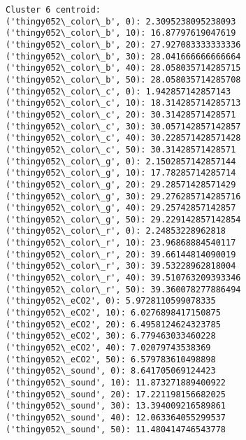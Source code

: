 \documentclass[11pt]{article}
\begin{document}
\begin{Verbatim}[commandchars=\\\{\}]
Cluster 6 centroid:
('thingy052\_color\_b', 0): 2.3095238095238093
('thingy052\_color\_b', 10): 16.87797619047619
('thingy052\_color\_b', 20): 27.927083333333336
('thingy052\_color\_b', 30): 28.041666666666664
('thingy052\_color\_b', 40): 28.058035714285715
('thingy052\_color\_b', 50): 28.058035714285708
('thingy052\_color\_c', 0): 1.942857142857143
('thingy052\_color\_c', 10): 18.314285714285713
('thingy052\_color\_c', 20): 30.31428571428571
('thingy052\_color\_c', 30): 30.057142857142857
('thingy052\_color\_c', 40): 30.228571428571428
('thingy052\_color\_c', 50): 30.31428571428571
('thingy052\_color\_g', 0): 2.1502857142857144
('thingy052\_color\_g', 10): 17.78285714285714
('thingy052\_color\_g', 20): 29.28571428571429
('thingy052\_color\_g', 30): 29.276285714285716
('thingy052\_color\_g', 40): 29.25742857142857
('thingy052\_color\_g', 50): 29.229142857142854
('thingy052\_color\_r', 0): 2.24853228962818
('thingy052\_color\_r', 10): 23.96868884540117
('thingy052\_color\_r', 20): 39.66144814090019
('thingy052\_color\_r', 30): 39.53228962818004
('thingy052\_color\_r', 40): 39.510763209393346
('thingy052\_color\_r', 50): 39.360078277886494
('thingy052\_eCO2', 0): 5.9728110599078335
('thingy052\_eCO2', 10): 6.0276898417150875
('thingy052\_eCO2', 20): 6.4958124624323785
('thingy052\_eCO2', 30): 6.779463033460228
('thingy052\_eCO2', 40): 7.02079743538369
('thingy052\_eCO2', 50): 6.579783610498898
('thingy052\_sound', 0): 8.641705069124423
('thingy052\_sound', 10): 11.873271889400922
('thingy052\_sound', 20): 17.221198156682025
('thingy052\_sound', 30): 13.394009216589861
('thingy052\_sound', 40): 12.063364055299537
('thingy052\_sound', 50): 11.480414746543778


\end{Verbatim}
\end{document}
